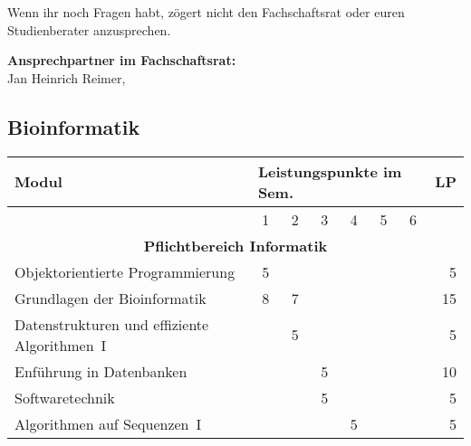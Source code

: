 Wenn ihr noch Fragen habt, zögert nicht den Fachschaftsrat oder euren Studienberater anzusprechen.

\textbf{Ansprechpartner im Fachschaftsrat:}\\
Jan Heinrich Reimer, \\

\newpage

\subsection{Bioinformatik}
\label{studiengang_bioinformatik}

\begin{table}[tbp]
	\begin{small}
		\begin{tabularx}{\textwidth}{|X||c|c|c|c|c|c||r|}
			\hline
			\textbf{Modul}                                                           & \multicolumn{6}{l||}{\textbf{Leistungspunkte im Sem.}} & \textbf{LP} \\ \hline
			                                                                         & 1  & 2  & 3  & 4  & 5  &               6               &             \\ \hline\hline
			\multicolumn{8}{|c|}{\textbf{Pflichtbereich Informatik}}                                                                                        \\ \hline
			Objektorientierte Programmierung                                         & 5  &    &    &    &    &                               &           5 \\ \hline
			Grundlagen der Bioinformatik                                             & 8  & 7  &    &    &    &                               &          15 \\ \hline
			Datenstrukturen und effiziente Algorithmen~I                             &    & 5  &    &    &    &                               &           5 \\ \hline
			Enführung in Datenbanken                                                 &    &    & 5  &    &    &                               &          10 \\ \hline
			Softwaretechnik                                                          &    &    & 5  &    &    &                               &           5 \\ \hline
			Algorithmen auf Sequenzen~I                                              &    &    &    & 5  &    &                               &           5 \\ \hline

\end{tabularx}
\end{small}
\end{table}
